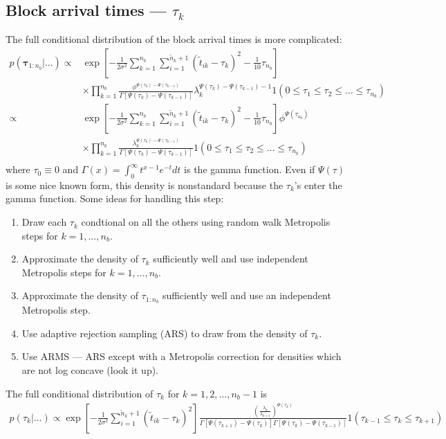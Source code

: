 \documentclass{article}
\begin{document}
\subsection{Block arrival times --- $\tau_k$}
The full conditional distribution of the block arrival times is more complicated:
\begin{align*}
p(\bm{\tau}_{1:n_{b}}|...) \propto & \exp\left[-\frac{1}{2\sigma^2}\sum_{k=1}^{n_{b}}\sum_{i=1}^{\tilde{n}_k+1}\left(\tilde{t}_{ik} - \tau_k\right)^2 - \frac{1}{10}\tau_{n_{b}}\right]\\
&\times \prod_{k=1}^{n_b}\frac{\phi^{\Psi(\tau_k) - \Psi(\tau_{k-1})}}{\Gamma\left[\Psi(\tau_k) - \Psi(\tau_{k-1})\right]}\lambda_k^{\Psi(\tau_k)-\Psi(\tau_{k-1}) - 1}1(0\le \tau_1 \le \tau_2 \le \hdots \le \tau_{n_b})\\
\propto & \exp\left[-\frac{1}{2\sigma^2}\sum_{k=1}^{n_{b}}\sum_{i=1}^{\tilde{n}_k+1}\left(\tilde{t}_{ik} - \tau_k\right)^2 - \frac{1}{10}\tau_{n_{b}}\right] \phi^{\Psi(\tau_{n_b})}\\
&\times \prod_{k=1}^{n_b}\frac{\lambda_k^{\Psi(\tau_k)-\Psi(\tau_{k-1})}}{\Gamma\left[\Psi(\tau_k) - \Psi(\tau_{k-1})\right]}1(0\le \tau_1 \le \tau_2 \le \hdots \le \tau_{n_b})\\
\end{align*}
where $\tau_0\equiv0$ and $\Gamma(x) = \int_0^\infty t^{x-1}e^{-t}dt$ is the gamma function. Even if $\Psi(\tau)$ is some nice known form, this density is nonstandard because the $\tau_k$'s enter the gamma function. Some ideas for handling this step:
\begin{enumerate}
\item Draw each $\tau_k$ condtional on all the others using random walk Metropolis steps for $k=1,\dots,n_{b}$.
\item Approximate the density of $\tau_k$ sufficiently well and use independent Metropolis steps for $k=1,\dots,n_{b}$.
\item Approximate the density of $\tau_{1:n_{b}}$ sufficiently well and use an independent Metropolis step.
\item Use adaptive rejection sampling (ARS) to draw from the density of $\tau_k$.
\item Use ARMS --- ARS except with a Metropolis correction for densities which are not log concave (look it up).
\end{enumerate}
The full conditional distribution of $\tau_k$ for $k=1,2,\dots,n_{b}-1$ is
\begin{align*}
p(\tau_k|...) \propto \exp\left[-\frac{1}{2\sigma^2}\sum_{i=1}^{\tilde{n}_k + 1}(\tilde{t}_{ik} - \tau_k)^2\right] \frac{\left(\frac{\lambda_k}{\lambda_{k+1}}\right)^{\Psi(\tau_k)}}{\Gamma\left[\Psi(\tau_{k+1}) - \Psi(\tau_k)\right]\Gamma\left[\Psi(\tau_{k}) - \Psi(\tau_{k-1})\right]}1(\tau_{k-1}\le \tau_k \le \tau_{k+1})
\end{align*}
\end{document}
